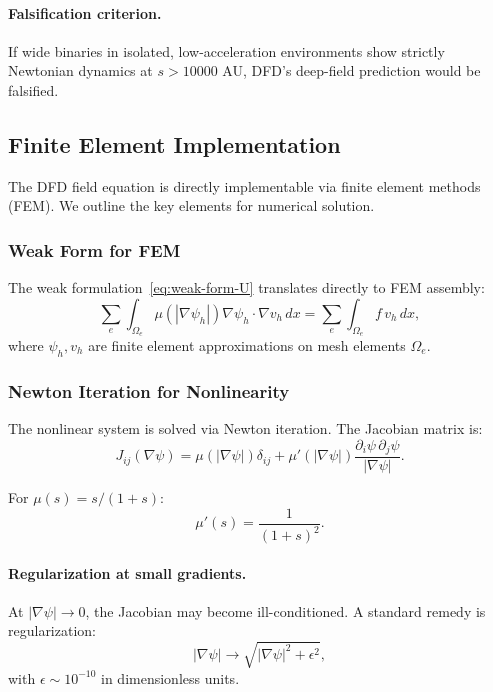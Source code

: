 \paragraph{Falsification criterion.}
If wide binaries in isolated, low-acceleration environments show 
strictly Newtonian dynamics at $s > 10000$ AU, DFD's deep-field 
prediction would be falsified.

\subsection{Finite Element Implementation}\label{app:fem}

The DFD field equation is directly implementable via finite element methods 
(FEM). We outline the key elements for numerical solution.

\subsubsection{Weak Form for FEM}

The weak formulation~\eqref{eq:weak-form-U} translates directly to FEM assembly:
\begin{equation}
\sum_e \int_{\Omega_e} \mu(|\nabla\psi_h|)\nabla\psi_h \cdot \nabla v_h\,dx 
= \sum_e \int_{\Omega_e} f\,v_h\,dx,
\end{equation}
where $\psi_h, v_h$ are finite element approximations on mesh elements $\Omega_e$.

\subsubsection{Newton Iteration for Nonlinearity}

The nonlinear system is solved via Newton iteration. The Jacobian matrix is:
\begin{equation}
J_{ij}(\nabla\psi) = \mu(|\nabla\psi|)\delta_{ij} + \mu'(|\nabla\psi|)\frac{\partial_i\psi\,\partial_j\psi}{|\nabla\psi|}.
\end{equation}

For $\mu(s) = s/(1+s)$:
\begin{equation}
\mu'(s) = \frac{1}{(1+s)^2}.
\end{equation}

\paragraph{Regularization at small gradients.}
At $|\nabla\psi| \to 0$, the Jacobian may become ill-conditioned. A standard 
remedy is regularization:
\begin{equation}
|\nabla\psi| \to \sqrt{|\nabla\psi|^2 + \epsilon^2},
\end{equation}
with $\epsilon \sim 10^{-10}$ in dimensionless units.

